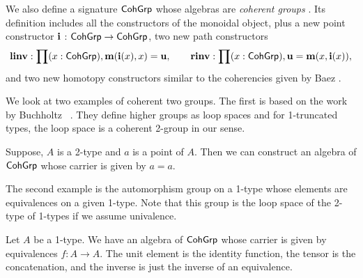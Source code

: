 
We also define a signature $\mathsf{CohGrp}$ whose algebras are \emph{coherent groups} \cite{baez2004groups}.
Its definition includes all the constructors of the monoidal object, plus a new point constructor
$\operatorname{\mathbf{i}}$ : $\mathsf{CohGrp} \rightarrow \mathsf{CohGrp}$, two new path
constructors
\[
\operatorname{\mathbf{linv}} : \prod (x : \mathsf{CohGrp}) , \operatorname{\mathbf{m}}(\operatorname{\mathbf{i}}(x),x) = \operatorname{\mathbf{u}},
\quad\quad
\operatorname{\mathbf{rinv}} : \prod (x : \mathsf{CohGrp}) , \operatorname{\mathbf{u}} = \operatorname{\mathbf{m}}(x,\operatorname{\mathbf{i}}(x)),
\]
and two new homotopy constructors similar to the coherencies given by Baez \cite{baez2004groups}.

We look at two examples of coherent two groups.
The first is based on the work by Buchholtz \etal \ \cite{DBLP:conf/lics/BuchholtzDR18}.
They define higher groups as loop spaces and for 1-truncated types, the loop space is a coherent 2-group in our sense.

\begin{example}
Suppose, $A$ is a 2-type and $a$ is a point of $A$.
Then we can construct an algebra of $\mathsf{CohGrp}$ whose carrier is given by $a = a$.
\end{example}

The second example is the automorphism group on a 1-type whose elements are equivalences on a given 1-type.
Note that this group is the loop space of the 2-type of 1-types if we assume univalence.

\begin{example}
Let $A$ be a 1-type.
We have an algebra of $\mathsf{CohGrp}$ whose carrier is given by equivalences $f : A \to A$.
The unit element is the identity function, the tensor is the concatenation, and the inverse is just the inverse of an equivalence.
\end{example}

